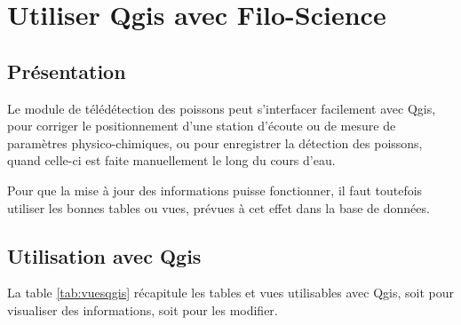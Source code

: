 \chapter{Utiliser Qgis avec Filo-Science}

\section{Présentation}

Le module de télédétection des poissons peut s'interfacer facilement avec Qgis, pour corriger le positionnement d'une station d'écoute ou de mesure de paramètres physico-chimiques, ou pour enregistrer la détection des poissons, quand celle-ci est faite manuellement le long du cours d'eau.

Pour que la mise à jour des informations puisse fonctionner, il faut toutefois utiliser les bonnes tables ou vues, prévues à cet effet dans la base de données.

\section{Utilisation avec Qgis}

La table \ref{tab:vuesqgis} récapitule les tables et vues utilisables avec Qgis, soit pour visualiser des informations, soit pour les modifier.

